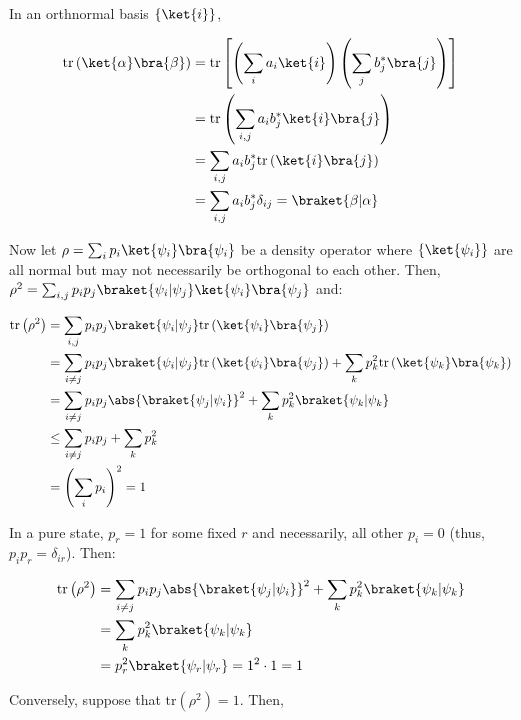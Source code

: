 \par In an orthnormal basis $\{\ket{i}\}$,

\begin{align}
\mathrm{tr} \left( \ket{\alpha} \bra{\beta} \right) &= \mathrm{tr} \left[ \left(
\sum_i{a_i \ket{i}} \right) \left( \sum_j{b_j^* \bra{j}} \right) \right] \\
&= \mathrm{tr} \left( \sum_{i, j}{a_i b_j^* \ket{i} \bra{j}} \right) \\
&= \sum_{i, j}{a_i b_j^* \mathrm{tr} \left( \ket{i} \bra{j} \right)} \\
&= \sum_{i, j}{a_i b_j^* \delta_{ij}} = \braket{\beta|\alpha}
\end{align}

\par Now let $\rho = \sum_i{p_i \ket{\psi_i} \bra{\psi_i}}$ be a density
operator where $\{\ket{\psi_i}\}$ are all normal but may not necessarily be
orthogonal to each other. Then, $\rho^2 = \sum_{i, j}{p_i p_j
\braket{\psi_i|\psi_j} \ket{\psi_i} \bra{\psi_j}}$ and:

\begin{align}
\mathrm{tr} \left( \rho^2 \right) &= \sum_{i, j}{p_i p_j \braket{\psi_i|\psi_j}
\mathrm{tr} \left( \ket{\psi_i} \bra{\psi_j} \right)} \\
&= \sum_{i \ne j}{p_i p_j \braket{\psi_i|\psi_j} \mathrm{tr} \left( \ket{\psi_i}
\bra{\psi_j} \right)} + \sum_k{p_k^2 \mathrm{tr} \left( \ket{\psi_k}
\bra{\psi_k} \right)} \\
&= \sum_{i \ne j}{p_i p_j \abs{\braket{\psi_j|\psi_i}}}^2 + \sum_k{p_k^2
\braket{\psi_k|\psi_k}} \\
&\le \sum_{i \ne j}{p_i p_j} + \sum_k{p_k^2} \\
&= \left( \sum_i{p_i} \right)^2 = 1
\end{align}

\par In a pure state, $p_r = 1$ for some fixed $r$ and necessarily, all other
$p_i = 0$ (thus, $p_i p_r = \delta_{ir}$). Then:

\begin{align}
\mathrm{tr} \left( \rho^2 \right) &= \sum_{i \ne j}{p_i p_j
\abs{\braket{\psi_j|\psi_i}}}^2 + \sum_k{p_k^2 \braket{\psi_k|\psi_k}} \\
&= \sum_k{p_k^2 \braket{\psi_k|\psi_k}} \\
&= p_r^2 \braket{\psi_r|\psi_r} = 1^2 \cdot 1 = 1
\end{align}

\par Conversely, suppose that $\mathrm{tr} \left( \rho^2 \right) = 1$. Then,

